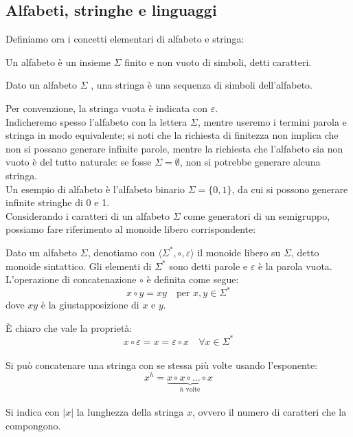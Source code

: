 \documentclass{article}
\begin{document}
\subsection{Alfabeti, stringhe e linguaggi}
Definiamo ora i concetti elementari di alfabeto e stringa:
\noindent
\begin{definition}
Un alfabeto è un insieme $\Sigma$ finito e non vuoto di simboli, detti caratteri.
\end{definition}
\begin{definition}
Dato un alfabeto $\Sigma$ , una stringa è una sequenza di simboli dell’alfabeto.
\end{definition}
\noindent Per convenzione, la stringa vuota è indicata con $\varepsilon$.
\\Indicheremo spesso l’alfabeto con la lettera $\Sigma$, mentre useremo i termini parola e stringa in modo equivalente; si noti che la richiesta di finitezza non implica che non si possano generare infinite parole, mentre la richiesta che l’alfabeto sia non vuoto è del tutto naturale: se fosse $\Sigma = \emptyset$, non si potrebbe generare alcuna stringa. \\Un esempio di alfabeto è l'alfabeto binario $\Sigma = \{0, 1\}$, da cui si possono generare infinite stringhe di 0 e 1.
\\\noindent
Considerando i caratteri di un alfabeto $\Sigma$ come generatori di un semigruppo, possiamo fare riferimento al monoide libero corrispondente:
\begin{definition}
Dato un alfabeto $\Sigma$, denotiamo con $\langle \Sigma^*, \circ, \varepsilon \rangle$ il monoide libero su $\Sigma$, detto monoide sintattico. Gli elementi di $\Sigma^*$ sono detti parole e $\varepsilon$ è la parola vuota. L'operazione di concatenazione $\circ$ è definita come segue:
\[ x \circ y = x y \quad \text{per } x, y \in \Sigma^* \]
dove $xy$ è la giustapposizione di $x$ e $y$.
\end{definition}
È chiaro che vale la proprietà:
\[ x \circ \varepsilon = x = \varepsilon \circ x \quad \text{$\forall$} x \in \Sigma^* \]
\\\noindent
Si può concatenare una stringa con se stessa più volte usando l'esponente:
\[ x^h = \underbrace{x \circ x \circ \ldots \circ x}_{h \text{ volte}} \]
\\\noindent
Si indica con $|x|$ la lunghezza della stringa $x$, ovvero il numero di caratteri che la compongono.
\\\noindent
\end{document}
